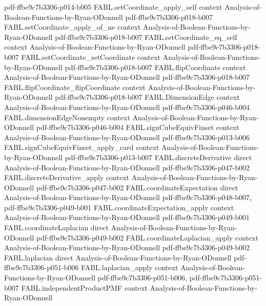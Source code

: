 \begin{theorem}
{    pdf-ffbe9c7b3306-p014-b005}
\proofstep
  {FABL.setCoordinate_apply_self}
  {context}
  {Analysis-of-Boolean-Functions-by-Ryan-ODonnell}
  {pdf-ffbe9c7b3306-p018-b007}
\proofstep
  {FABL.setCoordinate_apply_of_ne}
  {context}
  {Analysis-of-Boolean-Functions-by-Ryan-ODonnell}
  {pdf-ffbe9c7b3306-p018-b007}
\proofstep
  {FABL.setCoordinate_eq_self}
  {context}
  {Analysis-of-Boolean-Functions-by-Ryan-ODonnell}
  {pdf-ffbe9c7b3306-p018-b007}
\proofstep
  {FABL.setCoordinate_setCoordinate}
  {context}
  {Analysis-of-Boolean-Functions-by-Ryan-ODonnell}
  {pdf-ffbe9c7b3306-p018-b007}
\proofstep
  {FABL.flipCoordinate}
  {context}
  {Analysis-of-Boolean-Functions-by-Ryan-ODonnell}
  {pdf-ffbe9c7b3306-p018-b007}
\proofstep
  {FABL.flipCoordinate_flipCoordinate}
  {context}
  {Analysis-of-Boolean-Functions-by-Ryan-ODonnell}
  {pdf-ffbe9c7b3306-p018-b007}
\proofstep
  {FABL.DimensionEdge}
  {context}
  {Analysis-of-Boolean-Functions-by-Ryan-ODonnell}
  {pdf-ffbe9c7b3306-p046-b004}
\proofstep
  {FABL.dimensionEdgeNonempty}
  {context}
  {Analysis-of-Boolean-Functions-by-Ryan-ODonnell}
  {pdf-ffbe9c7b3306-p046-b004}
\proofstep
  {FABL.signCubeEquivFinset}
  {context}
  {Analysis-of-Boolean-Functions-by-Ryan-ODonnell}
  {pdf-ffbe9c7b3306-p013-b006}
\proofstep
  {FABL.signCubeEquivFinset_apply_card}
  {context}
  {Analysis-of-Boolean-Functions-by-Ryan-ODonnell}
  {pdf-ffbe9c7b3306-p013-b007}
\proofstep
  {FABL.discreteDerivative}
  {direct}
  {Analysis-of-Boolean-Functions-by-Ryan-ODonnell}
  {pdf-ffbe9c7b3306-p047-b002}
\proofstep
  {FABL.discreteDerivative_apply}
  {context}
  {Analysis-of-Boolean-Functions-by-Ryan-ODonnell}
  {pdf-ffbe9c7b3306-p047-b002}
\proofstep
  {FABL.coordinateExpectation}
  {direct}
  {Analysis-of-Boolean-Functions-by-Ryan-ODonnell}
  {pdf-ffbe9c7b3306-p048-b007,
    pdf-ffbe9c7b3306-p049-b001}
\proofstep
  {FABL.coordinateExpectation_apply}
  {context}
  {Analysis-of-Boolean-Functions-by-Ryan-ODonnell}
  {pdf-ffbe9c7b3306-p049-b001}
\proofstep
  {FABL.coordinateLaplacian}
  {direct}
  {Analysis-of-Boolean-Functions-by-Ryan-ODonnell}
  {pdf-ffbe9c7b3306-p049-b002}
\proofstep
  {FABL.coordinateLaplacian_apply}
  {context}
  {Analysis-of-Boolean-Functions-by-Ryan-ODonnell}
  {pdf-ffbe9c7b3306-p049-b002}
\proofstep
  {FABL.laplacian}
  {direct}
  {Analysis-of-Boolean-Functions-by-Ryan-ODonnell}
  {pdf-ffbe9c7b3306-p051-b006}
\proofstep
  {FABL.laplacian_apply}
  {context}
  {Analysis-of-Boolean-Functions-by-Ryan-ODonnell}
  {pdf-ffbe9c7b3306-p051-b006,
    pdf-ffbe9c7b3306-p051-b007}
\proofstep
  {FABL.independentProductPMF}
  {context}
  {Analysis-of-Boolean-Functions-by-Ryan-ODonnell}

\end{theorem}
